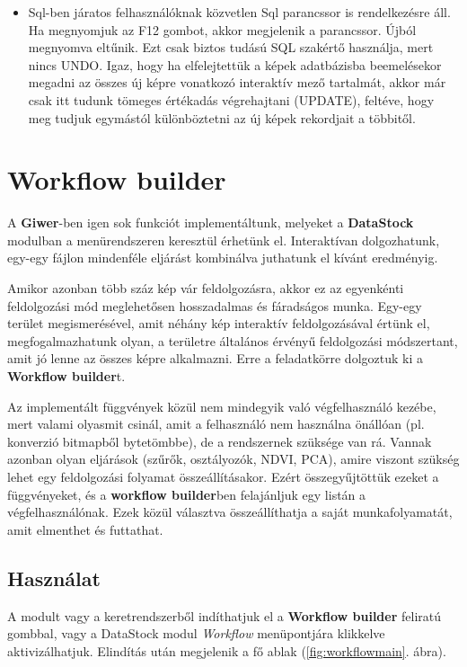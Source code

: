 \documentclass[a4paper,12pt]{article}
\begin{document}
\begin{itemize}
	
	
	\item Sql-ben járatos felhasználóknak közvetlen Sql parancssor is rendelkezésre áll. Ha megnyomjuk az F12 gombot, akkor megjelenik a parancssor. Újból megnyomva eltűnik. Ezt csak biztos tudású SQL szakértő használja, mert nincs UNDO. Igaz, hogy ha elfelejtettük a képek adatbázisba beemelésekor megadni az összes új képre vonatkozó interaktív mező tartalmát, akkor már csak itt tudunk tömeges értékadás végrehajtani (UPDATE), feltéve, hogy meg tudjuk egymástól különböztetni az új képek rekordjait a többitől.
	
	
	
\end{itemize}


\section{Workflow builder}

A \textbf{Giwer}-ben igen sok funkciót implementáltunk, melyeket a \textbf{DataStock} modulban a menürendszeren keresztül érhetünk el. Interaktívan dolgozhatunk, egy-egy fájlon mindenféle eljárást kombinálva juthatunk el kívánt eredményig. 

Amikor azonban több száz kép vár feldolgozásra, akkor ez az egyenkénti feldolgozási mód meglehetősen hosszadalmas és fáradságos munka. Egy-egy terület megismerésével, amit néhány kép interaktív feldolgozásával értünk el, megfogalmazhatunk olyan, a területre általános érvényű feldolgozási módszertant, amit jó lenne az összes képre alkalmazni. Erre a feladatkörre dolgoztuk ki a \textbf{Workflow builder}t.

Az implementált függvények közül nem mindegyik való végfelhasználó kezébe, mert valami olyasmit csinál, amit a felhasználó nem használna önállóan (pl. konverzió bitmapből bytetömbbe), de a rendszernek szüksége van rá. Vannak azonban olyan eljárások (szűrők, osztályozók, NDVI, PCA), amire viszont szükség lehet egy feldolgozási folyamat összeállításakor. Ezért összegyűjtöttük ezeket a függvényeket, és a \textbf{workflow builder}ben felajánljuk egy listán a végfelhasználónak. Ezek közül választva összeállíthatja a saját munkafolyamatát, amit elmenthet és futtathat.

\subsection{Használat}

A modult vagy a keretrendszerből indíthatjuk el a \textbf{Workflow builder} feliratú gombbal, vagy a DataStock modul \textit{Workflow} menüpontjára klikkelve aktivizálhatjuk. Elindítás után megjelenik a fő ablak (\ref{fig:workflowmain}. ábra).
\end{document}
